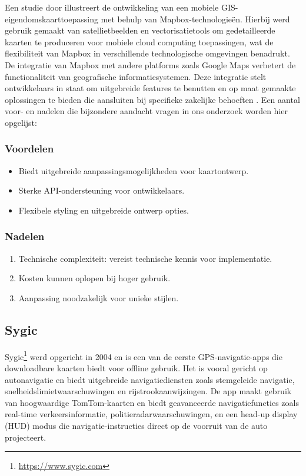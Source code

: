 Een studie door \textcite{Neene2017} illustreert de ontwikkeling van een mobiele GIS-eigendomskaarttoepassing met behulp van Mapbox-technologieën. Hierbij werd gebruik gemaakt van satellietbeelden en vectorisatietools om gedetailleerde kaarten te produceren voor mobiele cloud computing toepassingen, wat de flexibiliteit van Mapbox in verschillende technologische omgevingen benadrukt. De integratie van Mapbox met andere platforms zoals Google Maps verbetert de functionaliteit van geografische informatiesystemen. Deze integratie stelt ontwikkelaars in staat om uitgebreide features te benutten en op maat gemaakte oplossingen te bieden die aansluiten bij specifieke zakelijke behoeften \autocite{Hidayatulloh2023}. Een aantal voor- en nadelen die bijzondere aandacht vragen in ons onderzoek worden hier opgelijst:

\subsubsection*{Voordelen}
\begin{itemize}
    \item Biedt uitgebreide aanpassingsmogelijkheden voor kaartontwerp.
    \item Sterke API-ondersteuning voor ontwikkelaars.
    \item Flexibele styling en uitgebreide ontwerp opties.
\end{itemize}
\subsubsection*{Nadelen}
\begin{enumerate}
    \item Technische complexiteit: vereist technische kennis voor implementatie.
    \item Kosten kunnen oplopen bij hoger gebruik.
    \item Aanpassing noodzakelijk voor unieke stijlen.
\end{enumerate}

\subsection{Sygic}
Sygic\footnote{\url{https://www.sygic.com}} werd opgericht in 2004 en is een van de eerste GPS-navigatie-apps die downloadbare kaarten biedt voor offline gebruik. Het is vooral gericht op autonavigatie en biedt uitgebreide navigatiediensten zoals stemgeleide navigatie, snelheidslimietwaarschuwingen en rijstrookaanwijzingen. De app maakt gebruik van hoogwaardige TomTom-kaarten en biedt geavanceerde navigatiefuncties zoals real-time verkeersinformatie, politieradarwaarschuwingen, en een head-up display (HUD) modus die navigatie-instructies direct op de voorruit van de auto projecteert. 

